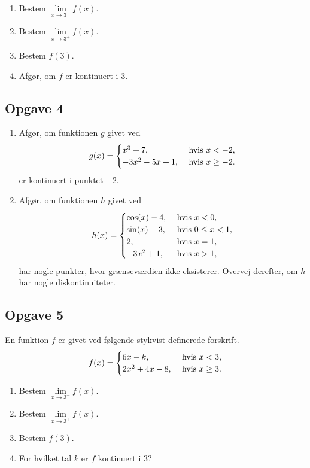 \begin{enumerate}[label=\roman*)]
	\item Bestem $\lim\limits_{x \to 3^{-}}f(x).$
	\item Bestem $\lim\limits_{x \to 3^{+}}f(x).$
	\item Bestem $f(3)$.
	\item Afgør, om $f$ er kontinuert i 3.
\end{enumerate}

\newpage

\subsection*{Opgave 4}
\begin{enumerate}[label=\roman*)]
	\item Afgør, om funktionen $g$ givet ved
	\begin{align*}
		g(x) = 
		\begin{cases}
			x^3 + 7, &\textnormal{ hvis } x < -2,\\
			-3x^2- 5x + 1, &\textnormal{ hvis } x \geq -2. 
		\end{cases}
	\end{align*}
	er kontinuert i punktet $-2$.
	\item Afgør, om funktionen $h$ givet ved
	\begin{align*}
		h(x) =		
		\begin{cases}
			\cos(x) - 4, &\textnormal{ hvis } x < 0,\\
			\sin(x) - 3, &\textnormal{ hvis } 0\leq x < 1, \\
			2, &\textnormal{ hvis } x = 1, \\
			-3x^2 + 1 , &\textnormal{ hvis } x > 1, \\ 
		\end{cases}
	\end{align*}
	har nogle punkter, hvor grænseværdien ikke eksisterer. Overvej derefter, om $h$ har nogle diskontinuiteter.
\end{enumerate}

\subsection*{Opgave 5}

En funktion $f$ er givet ved følgende stykvist definerede forskrift.
\begin{align*}
	f(x) =
	\begin{cases}
		6x - k, &\textnormal{ hvis } x < 3,\\
		2x^2 + 4x - 8, &\textnormal{ hvis } x \geq 3. 
	\end{cases}
\end{align*}
\begin{enumerate}[label=\roman*)]
	\item Bestem $\lim\limits_{x \to 3^{-}}f(x).$
	\item Bestem $\lim\limits_{x \to 3^{+}}f(x).$
	\item Bestem $f(3)$.
	\item For hvilket tal $k$ er $f$ kontinuert i 3?
\end{enumerate}

